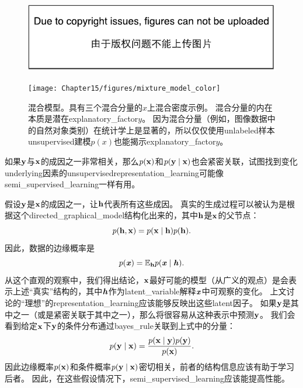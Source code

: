 
\begin{figure}[!htb]
\ifOpenSource
\centerline{\includegraphics{figure.pdf}}
\else
\centerline{\texttt{[image: Chapter15/figures/mixture\_model\_color]}}
\fi
\caption{混合模型。具有三个混合分量的$x$上混合密度示例。
混合分量的内在本质是潜在\gls{explanatory_factor}$y$。
因为混合分量（例如，图像数据中的自然对象类别）在统计学上是显著的，所以仅仅使用\gls{unlabeled}样本\gls{unsupervised}建模$p(x)$也能揭示\gls{explanatory_factor}$y$。
}
\label{fig:chap15_mixture_model}
\end{figure}



如果$\mathbf{y}$与$\mathbf{x}$的成因之一非常相关，那么$p(\mathbf{x})$和$p(\mathbf{y} \mid \mathbf{x})$也会紧密关联，试图找到变化\gls{underlying}因素的\gls{unsupervised}\gls{representation_learning}可能像\gls{semi_supervised_learning}一样有用。



假设$\mathbf{y}$是$\mathbf{x}$的成因之一，让$\mathbf{h}$代表所有这些成因。
真实的生成过程可以被认为是根据这个\gls{directed_graphical_model}结构化出来的，其中$\mathbf{h}$是$\mathbf{x}$的父节点：
\begin{equation}
	p(\mathbf{h}, \mathbf{x}) = p(\mathbf{x} \mid \mathbf{h}) p(\mathbf{h}).
\end{equation} %
因此，数据的边缘概率是
\begin{equation}
	p(\boldsymbol{\mathit{x}}) = \mathbb{E}_{\mathbf{h}} p(\boldsymbol{\mathit{x}} \mid \boldsymbol{\mathit{h}}).
\end{equation}
从这个直观的观察中，我们得出结论，$\mathbf{x}$最好可能的模型（从广义的观点）是会表示上述``真实''结构的，其中$\boldsymbol{\mathit{h}}$作为\gls{latent_variable}解释$\boldsymbol{\mathit{x}}$中可观察的变化。
上文讨论的``理想''的\gls{representation_learning}应该能够反映出这些\gls{latent}因子。
如果$\mathbf{y}$是其中之一（或是紧密关联于其中之一），那么将很容易从这种表示中预测$\mathbf{y}$。
我们会看到给定$\mathbf{x}$下$\mathbf{y}$的条件分布通过\gls{bayes_rule}关联到上式中的分量：
\begin{equation}
	p(\mathbf{y} \mid \mathbf{x}) = \frac{ p(\mathbf{x} \mid \mathbf{y}) p(\mathbf{y}) }{p(\mathbf{x})}.
\end{equation}
因此边缘概率$p(\mathbf{x})$和条件概率$p(\mathbf{y} \mid \mathbf{x})$密切相关，前者的结构信息应该有助于学习后者。
因此，在这些假设情况下，\gls{semi_supervised_learning}应该能提高性能。

